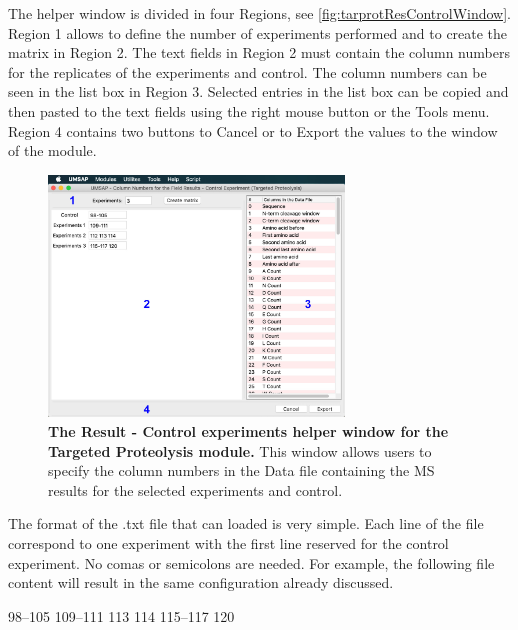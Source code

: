 The helper window is divided in four Regions, see \autoref{fig:tarprotResControlWindow}. Region \num{1} allows to define the number of experiments performed and to create the matrix in Region \num{2}. The text fields in Region \num{2} must contain the column numbers for the replicates of the experiments and control. The column numbers can be seen in the list box in Region \num{3}. Selected entries in the list box can be copied and then pasted to the text fields using the right mouse button or the Tools menu. Region \num{4} contains two buttons to Cancel or to Export the values to the window of the module.   

\begin{figure}[h]
	\centering
	\includegraphics[width=0.7\textwidth]{./IMAGES/MOD-TARPROT/tarprot-rescontrol.jpg}
	\caption[The Result - Control experiments helper window for the Targeted Proteolysis module]{\textbf{The Result - Control experiments helper window for the Targeted Proteolysis module.} This window allows users to specify the column numbers in the Data file containing the MS results for the selected experiments and control.} 
	\label{fig:tarprotResControlWindow}
	\vspace{-5pt} 	
\end{figure}

The format of the .txt file that can loaded is very simple. Each line of the file correspond to one experiment with the first line reserved for the control experiment. No comas or semicolons are needed. For example, the following file content will result in the same configuration already discussed.

\numrange[range-phrase = --]{98}{105} \newline 
\numrange[range-phrase = --]{109}{111}  113 114 \newline
\numrange[range-phrase = --]{115}{117} 120

